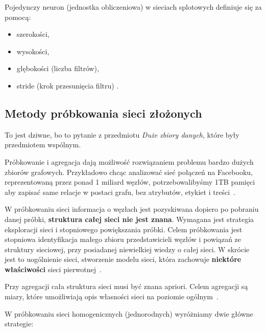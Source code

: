 \documentclass[wi]{zut}
\begin{document}
Pojedynczy neuron (jednostka obliczeniowa) w sieciach splotowych definiuje się za pomocą:

\begin{itemize}
    \item szerokości,
    \item wysokości,
    \item głębokości (liczba filtrów),
    \item stride (krok przesunięcia filtru) \cite{Forczmanski2020}.
\end{itemize}


\subsection{Metody próbkowania sieci złożonych}

To jest dziwne, bo to pytanie z przedmiotu \emph{Duże zbiory danych}, które były przedmiotem wspólnym.

Próbkowanie i agregacja dają możliwość rozwiązaniem problemu bardzo dużych zbiorów grafowych. Przykładowo chcąc analizować sieć połączeń na Facebooku, reprezentowaną przez ponad 1 miliard węzłów, potrzebowalibyśmy 1TB pamięci aby zapisać same relacje w postaci grafu, bez atrybutów, etykiet i treści~\cite{Jankowski2020_probkowanie}. 

W próbkowaniu sieci informacja o węzłach jest pozyskiwana dopiero po pobraniu danej próbki, \textbf{struktura całej sieci nie jest znana}. Wymagana jest strategia eksploracji sieci i stopniowego powiększania próbki. Celem próbkowania jest stopniowa identyfikacja małego zbioru przedstawicieli węzłów i powiązań ze struktury sieciowej, przy posiadanej niewielkiej wiedzy o całej sieci. W skrócie jest to uogólnienie sieci, stworzenie modelu sieci, która zachowuje \textbf{niektóre właściwości} sieci pierwotnej~\cite{Jankowski2020_probkowanie}. 

Przy agregacji cała struktura sieci musi być znana apriori. Celem agregacji są miary, które umożliwiają opis własności sieci na poziomie ogólnym~\cite{Jankowski2020_probkowanie}. 

W próbkowaniu sieci homogenicznych (jednorodnych) wyróżniamy dwie główne strategie:
\end{document}
